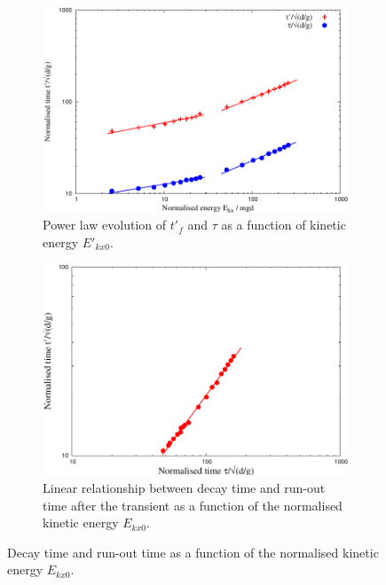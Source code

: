 \documentclass[3p,times,procedia,number]{elsarticle}
\begin{document}
\begin{figure}[tbhp]
  \centering
  \begin{subfigure}[b]{0.49\textwidth}
    \includegraphics[width=\textwidth]{figs/tp_tau_mgd}
    \caption{Power law evolution of $t'_f$ and $\tau$ as a function of kinetic 
    energy $E'_{kx0}$.}
    \label{fig:tp_tau_mgd}
  \end{subfigure}
  \begin{subfigure}[b]{0.49\textwidth}
    \centering
    \includegraphics[width=\textwidth]{figs/tp_tau}
    \caption{Linear relationship between decay time and run-out time after the 
    transient as a function of the normalised kinetic energy $E_{kx0}$.}
    \label{fig:tp_tau}
  \end{subfigure}
  \caption{Decay time and run-out time as a function of the normalised kinetic 
  energy $E_{kx0}$.}
  \label{fig:tp_Tau}
\end{figure}
\end{document}
